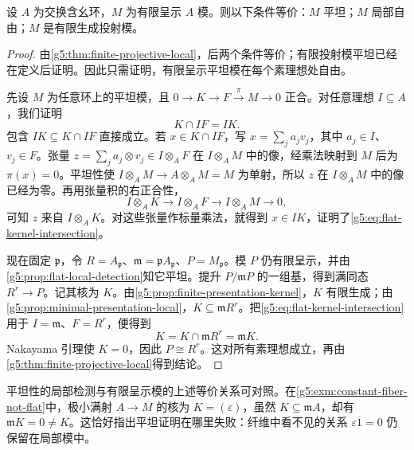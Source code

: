 \begin{theorem}
\label{g5:thm:finite-presented-flat}
	设 \(A\) 为交换含幺环，\(M\) 为有限呈示 \(A\) 模。则以下条件等价：\(M\) 平坦；\(M\) 局部自由；\(M\) 是有限生成投射模。
\end{theorem}
\begin{proof}
	由\cref{g5:thm:finite-projective-local}，后两个条件等价；有限投射模平坦已经在定义后证明。因此只需证明，有限呈示平坦模在每个素理想处自由。

	先设 \(M\) 为任意环上的平坦模，且 \(0\rightarrow K\rightarrow F\xrightarrow{\pi}M\rightarrow0\) 正合。对任意理想 \(I\subseteq A\)，我们证明
	\begin{equation}
	\label{g5:eq:flat-kernel-intersection}
		K\cap IF=IK.
	\end{equation}
	包含 \(IK\subseteq K\cap IF\) 直接成立。若 \(x\in K\cap IF\)，写 \(x=\sum_j a_jv_j\)，其中 \(a_j\in I\)、\(v_j\in F\)。张量
	\(z=\sum_j a_j\otimes v_j\in I\otimes_A F\)
	在 \(I\otimes_A M\) 中的像，经乘法映射到 \(M\) 后为 \(\pi(x)=0\)。平坦性使 \(I\otimes_A M\rightarrow A\otimes_A M=M\) 为单射，所以 \(z\) 在 \(I\otimes_A M\) 中的像已经为零。再用张量积的右正合性，
	\[
		I\otimes_A K\longrightarrow I\otimes_A F
		\longrightarrow I\otimes_A M\longrightarrow0,
	\]
	可知 \(z\) 来自 \(I\otimes_A K\)。对这些张量作标量乘法，就得到 \(x\in IK\)，证明了\eqref{g5:eq:flat-kernel-intersection}。

	现在固定 \(\mathfrak p\)，令 \(R=A_{\mathfrak p}\)、\(\mathfrak m=\mathfrak pA_{\mathfrak p}\)、\(P=M_{\mathfrak p}\)。模 \(P\) 仍有限呈示，并由\cref{g5:prop:flat-local-detection}知它平坦。提升 \(P/\mathfrak mP\) 的一组基，得到满同态 \(R^r\rightarrow P\)。记其核为 \(K\)。由\cref{g5:prop:finite-presentation-kernel}，\(K\) 有限生成；由\cref{g5:prop:minimal-presentation-local}，\(K\subseteq\mathfrak mR^r\)。把\eqref{g5:eq:flat-kernel-intersection}用于 \(I=\mathfrak m\)、\(F=R^r\)，便得到
	\[
		K=K\cap\mathfrak mR^r=\mathfrak mK.
	\]
	Nakayama 引理使 \(K=0\)，因此 \(P\cong R^r\)。这对所有素理想成立，再由\cref{g5:thm:finite-projective-local}得到结论。
\end{proof}

平坦性的局部检测与有限呈示模的上述等价关系可对照\cite[第7节，定理7.1、7.10、7.12及其推论]{Matsumura1989}。在\cref{g5:exm:constant-fiber-not-flat}中，极小满射 \(A\rightarrow M\) 的核为 \(K=(\varepsilon)\)，虽然 \(K\subseteq\mathfrak mA\)，却有 \(\mathfrak mK=0\ne K\)。这恰好指出平坦证明在哪里失败：纤维中看不见的关系 \(\varepsilon\overline1=0\) 仍保留在局部模中。

